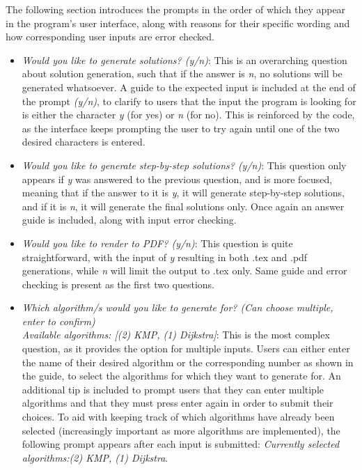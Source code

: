 \documentclass{l4proj}
\begin{document}
The following section introduces the prompts in the order of which they appear in the program's user interface, along with reasons for their specific wording and how corresponding user inputs are error checked.
\begin{itemize}
	\item
	\emph{Would you like to generate solutions? (y/n)}: This is an overarching question about solution generation, such that if the answer is \emph{n}, no solutions will be generated whatsoever. A guide to the expected input is included at the end of the prompt \emph{(y/n)}, to clarify to users that the input the program is looking for is either the character \emph{y} (for yes) or \emph{n} (for no). This is reinforced by the code, as the interface keeps prompting the user to try again until one of the two desired characters is entered.
	\item
	\emph{Would you like to generate step-by-step solutions? (y/n)}: This question only appears if \emph{y} was answered to the previous question, and is more focused, meaning that if the answer to it is \emph{y}, it will generate step-by-step solutions, and if it is \emph{n}, it will generate the final solutions only. Once again an answer guide is included, along with input error checking.
	\item
	\emph{Would you like to render to PDF? (y/n)}: This question is quite straightforward, with the input of \emph{y} resulting in both .tex and .pdf generations, while \emph{n} will limit the output to .tex only. Same guide and error checking is present as the first two questions.
	\item
	\emph{Which algorithm/s would you like to generate for? (Can choose multiple, enter to confirm) \\ Available algorithms: [(2) KMP, (1) Dijkstra]}: This is the most complex question, as it provides the option for multiple inputs. Users can either enter the name of their desired algorithm or the corresponding number as shown in the guide, to select the algorithms for which they want to generate for. An additional tip is included to prompt users that they can enter multiple algorithms and that they must press enter again in order to submit their choices. To aid with keeping track of which algorithms have already been selected (increasingly important as more algorithms are implemented), the following prompt appears after each input is submitted: \emph{Currently selected algorithms:(2) KMP, (1) Dijkstra}. 
\end{itemize}
\end{document}
